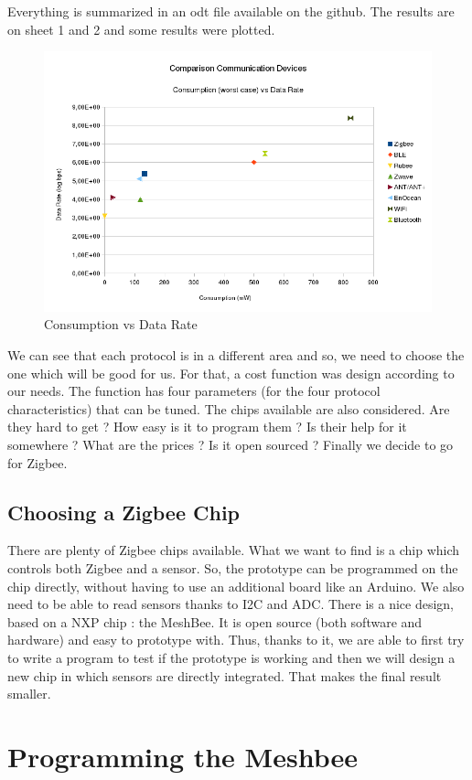 Everything is summarized in an odt file available on the github. The results are on sheet 1 and 2 and some results were plotted.

\begin{figure}[ht]
\centering
\includegraphics[width=.6\linewidth]{conso_vs_data_rate}
\caption[Consumption vs Data Rate]{\label{f:conso_vs_data_rate}Consumption vs Data Rate}
\end{figure}

We can see that each protocol is in a different area and so, we need to choose the one which will be good for us. For that, a cost function was design according to our needs. The function has four parameters (for the four protocol characteristics) that can be tuned. The chips available are also considered. Are they hard to get ? How easy is it to program them ? Is their help for it somewhere ? What are the prices ? Is it open sourced ? Finally we decide to go for Zigbee.

\subsection{Choosing a Zigbee Chip}

There are plenty of Zigbee chips available. What we want to find is a chip which controls both Zigbee and a sensor. So, the prototype can be programmed on the chip directly, without having to use an additional board like an Arduino. We also need to be able to read sensors thanks to I2C and ADC. There is a nice design, based on a NXP chip : the MeshBee. It is open source (both software and hardware) and easy to prototype with. Thus, thanks to it, we are able to first try to write a program to test if the prototype is working and then we will design a new chip in which sensors are directly integrated. That makes the final result smaller.

\section{Programming the Meshbee}


